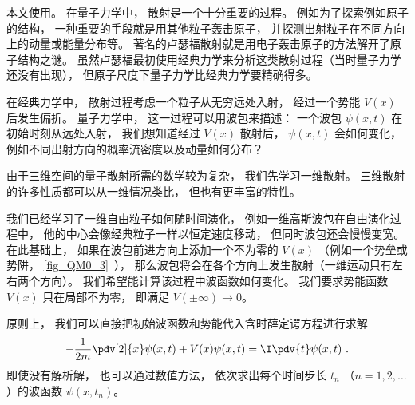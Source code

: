
\begin{issues}
\issueTODO
\end{issues}


本文使用。 在量子力学中， 散射是一个十分重要的过程。 例如为了探索例如原子的结构， 一种重要的手段就是用其他粒子轰击原子， 并探测出射粒子在不同方向上的动量或能量分布等。 著名的卢瑟福散射就是用电子轰击原子的方法解开了原子结构之谜。 虽然卢瑟福最初使用经典力学来分析这类散射过程（当时量子力学还没有出现）， 但原子尺度下量子力学比经典力学要精确得多。

在经典力学中， 散射过程考虑一个粒子从无穷远处入射， 经过一个势能 $V(x)$ 后发生偏折。 量子力学中， 这一过程可以用波包来描述： 一个波包 $\psi(x, t)$ 在初始时刻从远处入射， 我们想知道经过 $V(x)$ 散射后， $\psi(x, t)$ 会如何变化， 例如不同出射方向的概率流密度以及动量如何分布？

由于三维空间的量子散射所需的数学较为复杂， 我们先学习一维散射。 三维散射的许多性质都可以从一维情况类比， 但也有更丰富的特性。

我们已经学习了一维自由粒子如何随时间演化， 例如一维高斯波包在自由演化过程中， 他的中心会像经典粒子一样以恒定速度移动， 但同时波包还会慢慢变宽。 在此基础上， 如果在波包前进方向上添加一个不为零的 $V(x)$ （例如一个势垒或势阱， \autoref{fig_QM0_3}~）， 那么波包将会在各个方向上发生散射（一维运动只有左右两个方向）。 我们希望能计算该过程中波函数如何变化。 我们要求势能函数 $V(x)$ 只在局部不为零， 即满足 $V(\pm\infty) \to 0$。 

原则上， 我们可以直接把初始波函数和势能代入含时薛定谔方程进行求解
\begin{equation}\label{eq_Sca1D_1}
-\frac{1}{2m}\pdv[2]{x}\psi(x, t) + V(x) \psi(x, t) = \I \pdv{t} \psi(x, t)~.
\end{equation}
即使没有解析解， 也可以通过数值方法， 依次求出每个时间步长 $t_n$ （$n = 1, 2, \dots$）的波函数 $\psi(x, t_n)$。

